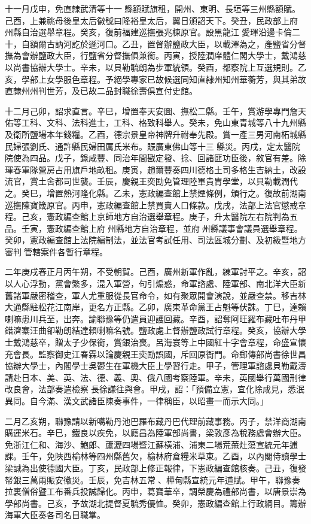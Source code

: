 \begin{pinyinscope}
十一月戊申，免直隸武清等十一縣額賦旗租，開州、東明、長垣等三州縣額賦。己酉，上兼祧母後皇太后徽號曰隆裕皇太后，翼日頒詔天下。癸丑，民政部上府州縣自治選舉章程。癸亥，復前福建巡撫張兆棟原官。設黑龍江愛琿沿邊卡倫二十，自額爾古訥河訖於遜河口。乙丑，置督辦鹽政大臣，以載澤為之，產鹽省分督撫為會辦鹽政大臣，行鹽省分督撫俱兼銜。丙寅，授陸潤庠體仁閣大學士，戴鴻慈以尚書協辦大學士。辛未，以貝勒毓朗為步軍統領。癸酉，都察院上互選規則。乙亥，學部上女學服色章程。予絕學專家已故候選同知直隸州知州華蘅芳，與其弟故直隸州州判世芳，及已故二品封職徐壽俱宣付史館。

十二月己卯，詔求直言。辛巳，增置奉天安圖、撫松二縣。壬午，賞游學專門詹天佑等工科、文科、法科進士，工科、格致科舉人。癸未，免山東青城等八十九州縣及衛所鹽場本年錢糧。乙酉，德宗景皇帝神牌升祔奉先殿。賞一產三男河南柘城縣民婦張劉氏、通許縣民婦田厲氏米布。賑廣東佛山等十三縣災。丙戌，定太醫院院使為四品。戊子，錄咸豐、同治年間戡定發、捻、回諸匪功臣後，敘官有差。除琿春軍隊營房占用旗戶地畝租。庚寅，趙爾豐奏四川德格土司多格生吉納土，改設流官，賞土舍都司世襲。壬辰，慶親王奕劻免管理陸軍貴胄學堂，以貝勒載潤代之。癸巳，增置熱河隆化縣。乙未，憲政編查館上禁煙條例，頒行之。復故前湖南巡撫陳寶箴原官。丙申，憲政編查館上禁買賣人口條款。戊戌，法部上法官懲戒章程。己亥，憲政編查館上京師地方自治選舉章程。庚子，升太醫院左右院判為五品。壬寅，憲政編查館上府州縣地方自治章程，並府州縣議事會議員選舉章程。癸卯，憲政編查館上法院編制法，並法官考試任用、司法區城分劃、及初級暨地方審判管轄案件各暫行章程。

二年庚戌春正月丙午朔，不受朝賀。己酉，廣州新軍作亂，練軍討平之。辛亥，詔以人心浮動，黨會繁多，混入軍營，句引煽惑，命軍諮處、陸軍部、南北洋大臣新舊諸軍嚴密稽查，軍人尤重服從長官命令，如有聚眾開會演說，並嚴查禁。移吉林大通縣駐松花江南岸，更名方正縣。乙卯，廣東革命黨王占魁等伏誅。丁巳，達賴喇嘛患川兵至，出奔。諭聯豫等仍遣員迎護回藏。辛酉，詔奪阿旺羅布藏吐布丹甲錯濟寨汪曲卻勒朗結達賴喇嘛名號。鹽政處上督辦鹽政試行章程。癸亥，協辦大學士戴鴻慈卒，贈太子少保銜，賞銀治喪。呂海寰等上中國紅十字會章程，命盛宣懷充會長。監察御史江春霖以論慶親王奕劻誤國，斥回原衙門。命郵傳部尚書徐世昌協辦大學士，內閣學士吳鬱生在軍機大臣上學習行走。甲子，管理軍諮處貝勒戴濤請赴日本、美、英、法、德、義、奧、俄八國考察陸軍。辛未，英國舉行萬國刑律改良會，法部奏遣檢察長徐謙往與會。甲戌，詔：「預備立憲，宜化除成見，悉泯異同。自今滿、漢文武諸臣陳奏事件，一律稱臣，以昭畫一而示大同。」

二月乙亥朔，聯豫請以新噶勒丹池巴羅布藏丹巴代理前藏事務。丙子，禁洋商湖南購運米石。辛巳，鐵良以疾免，以廕昌為陸軍部尚書，梁敦彥為稅務處會辦大臣。免浙江仁和、海沙、鮑郎、蘆瀝四場暨江蘇橫浦、浦東二場荒蕪灶蕩宣統元年逋課。壬午，免陜西榆林等四州縣舊欠，榆林府倉糧米草束。乙酉，以內閣侍讀學士梁誠為出使德國大臣。丁亥，民政部上修正報律，下憲政編查館核奏。己丑，復發帑銀三萬兩賑安徽災。壬辰，免吉林五常、樺甸縣宣統元年逋賦。甲午，聯豫奏拉裏僧俗暨工布番兵投誠歸化。丙申，葛寶華卒，調榮慶為禮部尚書，以唐景崇為學部尚書。己亥，予故湖北提督夏毓秀優恤。癸卯，憲政編查館上行政綱目。籌辦海軍大臣奏各司名目職掌。


\end{pinyinscope}
